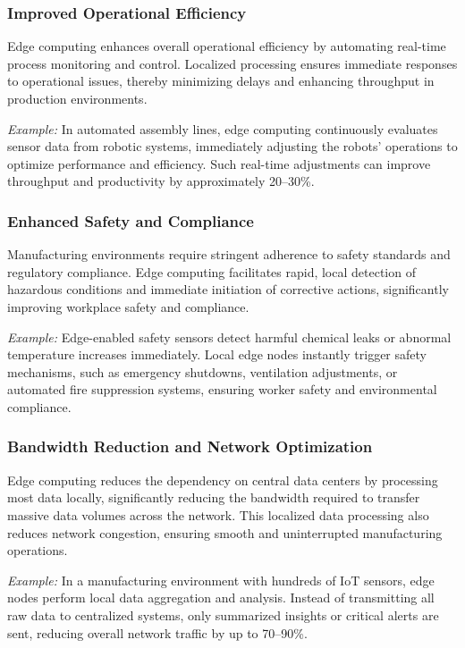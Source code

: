 \documentclass[runningheads]{llncs}
\begin{document}
\subsubsection{Improved Operational Efficiency}
Edge computing enhances overall operational efficiency by automating real-time process monitoring and control. Localized processing ensures immediate responses to operational issues, thereby minimizing delays and enhancing throughput in production environments.

\textit{Example:} In automated assembly lines, edge computing continuously evaluates sensor data from robotic systems, immediately adjusting the robots' operations to optimize performance and efficiency. Such real-time adjustments can improve throughput and productivity by approximately 20–30\%.

\subsubsection{Enhanced Safety and Compliance}
Manufacturing environments require stringent adherence to safety standards and regulatory compliance. Edge computing facilitates rapid, local detection of hazardous conditions and immediate initiation of corrective actions, significantly improving workplace safety and compliance.

\textit{Example:} Edge-enabled safety sensors detect harmful chemical leaks or abnormal temperature increases immediately. Local edge nodes instantly trigger safety mechanisms, such as emergency shutdowns, ventilation adjustments, or automated fire suppression systems, ensuring worker safety and environmental compliance.

\subsubsection{Bandwidth Reduction and Network Optimization}
Edge computing reduces the dependency on central data centers by processing most data locally, significantly reducing the bandwidth required to transfer massive data volumes across the network. This localized data processing also reduces network congestion, ensuring smooth and uninterrupted manufacturing operations.

\textit{Example:} In a manufacturing environment with hundreds of IoT sensors, edge nodes perform local data aggregation and analysis. Instead of transmitting all raw data to centralized systems, only summarized insights or critical alerts are sent, reducing overall network traffic by up to 70–90\%.
\end{document}
